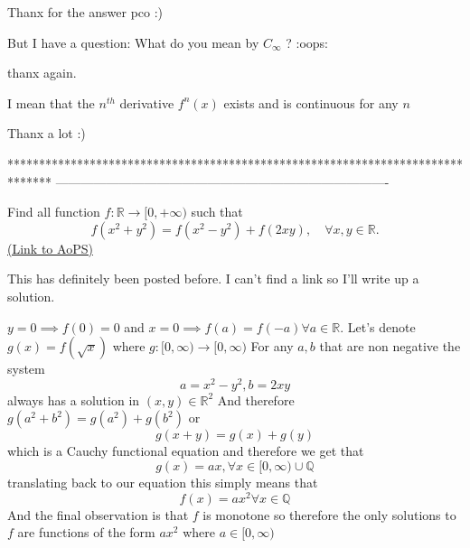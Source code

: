 \begin{solution}
	\begin{tcolorbox}Thanx for the answer pco  :) 
 
But I have a question: What do you mean by $ C_{\infty}$ ? :oops: 

thanx again.\end{tcolorbox}

I mean that the $ n^{th}$ derivative $ f^n(x)$ exists and is continuous for any $ n$
\end{solution}



\begin{solution}
	Thanx a lot  :)
\end{solution}
*******************************************************************************
-------------------------------------------------------------------------------

\begin{problem}
	Find all function $ f: \mathbb R \to [0,+\infty)$ such that \[ f(x^2+y^2)=f(x^2-y^2)+f(2xy), \quad \forall x,y \in \mathbb R.\]
	\flushright \href{https://artofproblemsolving.com/community/c6h295339}{(Link to AoPS)}
\end{problem}



\begin{solution}
	This has definitely been posted before. I can't find a link so I'll write up a solution.

$ y=0\implies f(0)=0$ and $ x=0\implies f(a)=f(-a)\forall a\in \mathbb{R}$.
Let's denote $ g(x)=f(\sqrt{x})$ where $ g: [0,\infty)\to[0,\infty)$
For any $ a,b$ that are non negative the system 
\[ a=x^2-y^2,b=2xy\]
always has a solution in $ (x,y)\in \mathbb{R}^2$
And therefore $ g(a^2+b^2)=g(a^2)+g(b^2)$ or
\[ g(x+y)=g(x)+g(y)\]
which is a Cauchy functional equation and therefore we get that
\[ g(x)=ax,\forall x\in [0,\infty)\cup \mathbb{Q}\]
translating back to our equation this simply means that
\[ f(x)=ax^2\forall x\in \mathbb{Q}\]
And the final observation is that $ f$ is monotone so therefore the only solutions to $ f$ are functions of the form $ ax^2$ where $ a\in [0,\infty)$
\end{solution}



